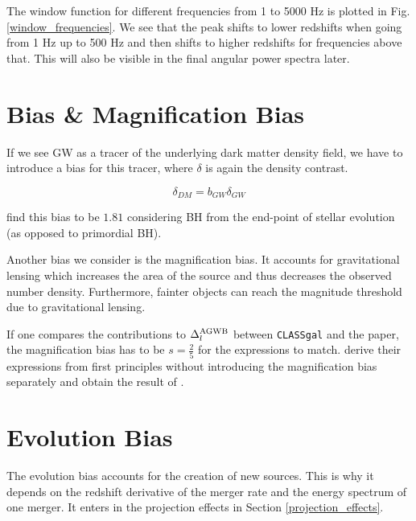 The window function for different frequencies from 1 to 5000 Hz is plotted in Fig. \ref{window_frequencies}. We see that the peak shifts to lower redshifts when going from 1 Hz up to 500 Hz and then shifts to higher redshifts for frequencies above that. This will also be visible in the final angular power spectra later.


\section{Bias \& Magnification Bias}
\label{bias_section}
If we see GW as a tracer of the underlying dark matter density field, we have to introduce a bias for this tracer, where $\delta$ is again the density contrast.

\begin{equation}
    \delta_{DM}=b_{GW}\delta_{GW}
\end{equation}

\cite{scelfo_gwtimeslss_2018} find this bias to be $1.81$ considering BH from the end-point of stellar evolution (as opposed to primordial BH).

Another bias we consider is the magnification bias. It accounts for gravitational lensing which increases the area of the source and thus decreases the observed number density. Furthermore, fainter objects can reach the magnitude threshold due to gravitational lensing.

If one compares the contributions to $\Delta_l^{\rm{AGWB}}$ between {\tt CLASSgal} and the \cite{dallarmi_dipole_2022} paper, the magnification bias has to be  $s=\frac{2}{5}$ for the expressions to match. \cite{bertacca_projection_2020} derive their expressions from first principles without introducing the magnification bias separately and obtain the result of \cite{dallarmi_dipole_2022}.

\section{Evolution Bias}
\label{evo_bias_section}
The evolution bias accounts for the creation of new sources. This is why it depends on the redshift derivative of the merger rate and the energy spectrum of one merger. 
It enters in the projection effects in Section \ref{projection_effects}.


